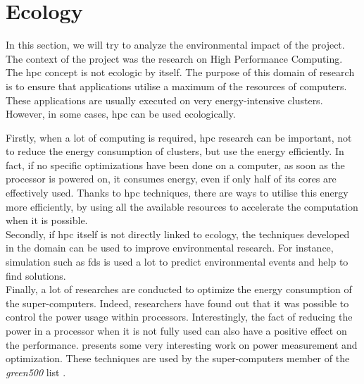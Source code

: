 
\clearpage{}
\section{Ecology}

In this section, we will try to analyze the environmental impact of the
project.\\

The context of the project was the research on High Performance Computing. The
\gls{hpc} concept is not ecologic by itself. The purpose of this domain of
research is to ensure that applications utilise a maximum of the resources of
computers. These applications are usually executed on very energy-intensive
clusters. However, in some cases, \gls{hpc} can be used ecologically.

Firstly, when a lot of computing is required, \gls{hpc} research can be
important, not to reduce the energy consumption of clusters, but use the energy
efficiently. In fact, if no specific optimizations have been done on a computer,
as soon as the processor is powered on, it consumes energy, even if only half of
its cores are effectively used. Thanks to \gls{hpc} techniques, there are ways
to utilise this energy more efficiently, by using all the available resources to
accelerate the computation when it is possible.\\

Secondly, if \gls{hpc} itself is not directly linked to ecology, the techniques
developed in the domain can be used to improve environmental research. For
instance, simulation such as \gls{fds} is used a lot to predict environmental
events and help to find solutions.\\

Finally, a lot of researches are conducted to optimize the energy consumption of
the super-computers. Indeed, researchers have found out that it was possible to
control the power usage within processors. Interestingly, the fact of reducing
the power in a processor when it is not fully used can also have a positive
effect on the performance. \cite{song2009energy} presents some very interesting
work on power measurement and optimization. These techniques are used by the
super-computers member of the \textit{green500} list \cite{enwiki:1230059074}.
